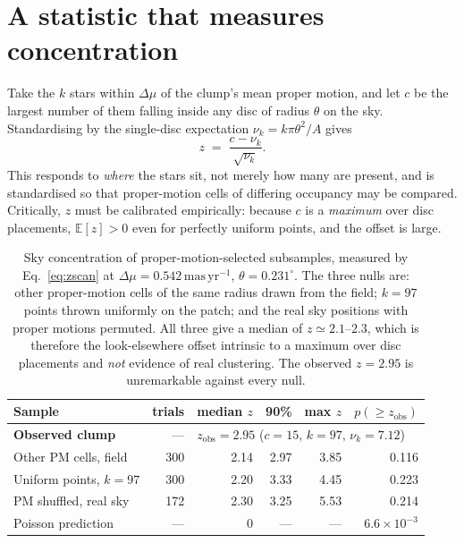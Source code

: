 \documentclass[11pt,a4paper]{article}
\begin{document}
\section{A statistic that measures concentration}
\label{sec:conc}

Take the $k$ stars within $\Delta\mu$ of the clump's mean proper motion, and let
$c$ be the largest number of them falling inside any disc of radius $\theta$ on
the sky. Standardising by the single-disc expectation $\nu_k=k\pi\theta^{2}/A$
gives
%
\begin{equation}
z \;=\; \frac{c-\nu_k}{\sqrt{\nu_k}} .
\label{eq:zscan}
\end{equation}
%
This responds to \emph{where} the stars sit, not merely how many are present, and
is standardised so that proper-motion cells of differing occupancy may be
compared. Critically, $z$ must be calibrated empirically: because $c$ is a
\emph{maximum} over disc placements, $\mathbb{E}[z]>0$ even for perfectly uniform
points, and the offset is large.

\begin{table}[h]
\centering
\caption{Sky concentration of proper-motion-selected subsamples, measured by
Eq.~\eqref{eq:zscan} at $\Delta\mu=0.542\,\mathrm{mas\,yr}^{-1}$,
$\theta=0.231^\circ$. The three nulls are: other proper-motion cells of the same
radius drawn from the field; $k=97$ points thrown uniformly on the patch; and the
real sky positions with proper motions permuted. All three give a median of
$z\simeq2.1$--$2.3$, which is therefore the look-elsewhere offset intrinsic to a
maximum over disc placements and \emph{not} evidence of real clustering. The
observed $z=2.95$ is unremarkable against every null.}
\label{tab:conc}
\small
\begin{tabular}{@{}lrrrrr@{}}
\toprule
Sample & trials & median $z$ & 90\% & max $z$ & $p(\ge z_{\mathrm{obs}})$ \\
\midrule
\textbf{Observed clump} & --- & \multicolumn{4}{l}{$z_{\mathrm{obs}}=2.95$ \quad($c=15$, $k=97$, $\nu_k=7.12$)} \\
\midrule
Other PM cells, field       & 300 & 2.14 & 2.97 & 3.85 & 0.116 \\
Uniform points, $k=97$      & 300 & 2.20 & 3.33 & 4.45 & 0.223 \\
PM shuffled, real sky       & 172 & 2.30 & 3.25 & 5.53 & 0.214 \\
\midrule
Poisson prediction          & --- & 0    & ---  & ---  & $6.6\times10^{-3}$ \\
\bottomrule
\end{tabular}
\end{table}
\end{document}
